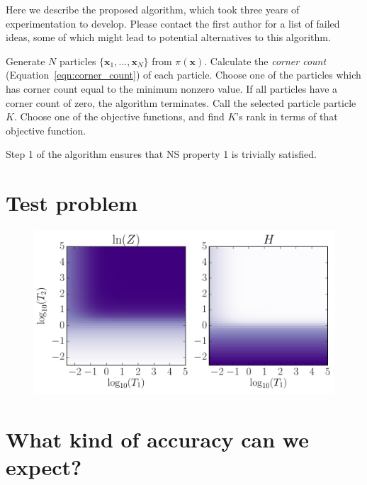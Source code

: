 \documentclass[journal,article,accept,moreauthors,pdftex,12pt,a4paper]{mdpi}
\newcommand{\xx}{\boldsymbol{x}}
\begin{document}
Here we describe the proposed algorithm, which took three years of
experimentation to develop. Please contact the first author for a list of
failed ideas, some of which might lead to potential alternatives to this
algorithm. 

\begin{algorithm}
\begin{algorithmic}
\State Generate $N$ particles $\{\xx_1, ..., \xx_N\}$ from $\pi(\xx)$.
	\State Calculate the {\it corner count} (Equation~\ref{eqn:corner_count})
of each particle.
	\State Choose one of the particles which has corner count equal to the
minimum nonzero value. If all particles have a corner count of zero,
the algorithm terminates. Call the selected particle particle $K$.
	\State Choose one of the objective functions, and find $K$'s rank in terms
of that objective function.
\EndWhile
\end{algorithmic}
\end{algorithm}

Step 1 of the algorithm ensures that NS property 1 is trivially satisfied.



\section{Test problem}

\begin{figure}
\centering
\includegraphics[scale=0.75]{figures/truth.pdf}
\caption{\label{fig:truth}}
\end{figure}


\section{What kind of accuracy can we expect?}
\end{document}
